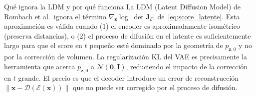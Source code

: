 \begin{observacion}{Qué ignora la LDM y por qué funciona}
La LDM (Latent Diffusion Model) de Rombach et al.\ ignora el término
$\nabla_{\bm{z}}\log|\det\bm{J}_\mathcal{E}|$ de~\eqref{eq:score_latente}.
Esta aproximación es válida cuando (1) el encoder es aproximadamente isométrico
(preserva distancias), o (2) el proceso de difusión en el latente es
suficientemente largo para que el score en $t$ pequeño esté dominado por la
geometría de $p_{\bm{z},0}$ y no por la corrección de volumen. La regularización
KL del VAE es precisamente la herramienta que acerca $p_{\bm{z},0}$ a
$\mathcal{N}(\bm{0},\bm{I})$, reduciendo el impacto de la corrección en $t$
grande. El precio es que el decoder introduce un error de reconstrucción
$\|\bm{x} - \mathcal{D}(\mathcal{E}(\bm{x}))\|$ que no puede ser corregido
por el proceso de difusión.
\end{observacion}


